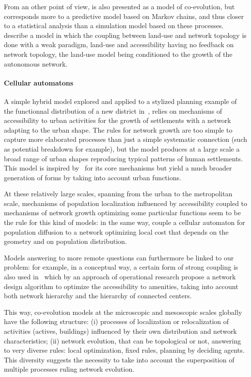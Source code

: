 From an other point of view, \cite{levinson2005paving} is also presented as a model of co-evolution, but corresponds more to a predictive model based on Markov chains, and thus closer to a statistical analysis than a simulation model based on these processes. \cite{rui2011urban} describe a model in which the coupling between land-use and network topology is done with a weak paradigm, land-use and accessibility having no feedback on network topology, the land-use model being conditioned to the growth of the autonomous network.




\paragraph{Cellular automatons}


A simple hybrid model explored and applied to a stylized planning example of the functionnal distribution of a new district in~\cite{raimbault2014hybrid}, relies on mechanisms of accessibility to urban activities for the growth of settlements with a network adapting to the urban shape. The rules for network growth are too simple to capture more elaborated processes than just a simple systematic connection (such as potential breakdown for example), but the model produces at a large scale a broad range of urban shapes reproducing typical patterns of human settlements. This model is inspired by~\cite{moreno2012automate} for its core mechanisms but yield a much broader generation of forms by taking into account urban functions.


At these relatively large scales, spanning from the urban to the metropolitan scale, mechanisms of population localization influenced by accessibility coupled to mechanisms of network growth optimizing some particular functions seem to be the rule for this kind of models: in the same way, \cite{wu2017city} couple a cellular automaton for population diffusion to a network optimizing local cost that depends on the geometry and on population distribution.


Models answering to more remote questions can furthermore be linked to our problem: for example, in a conceptual way, a certain form of strong coupling is also used in~\cite{bigotte2010integrated} which by an approach of operational research propose a network design algorithm to optimize the accessibility to amenities, taking into account both network hierarchy and the hierarchy of connected centers.


This way, co-evolution models at the microscopic and mesoscopic scales globally have the following structure: (i) processes of localization or relocalization of activities (actives, buildings) influenced by their own distribution and network characteristics; (ii) network evolution, that can be topological or not, answering to very diverse rules: local optimization, fixed rules, planning by deciding agents. This diversity suggests the necessity to take into account the superposition of multiple processes ruling network evolution.


